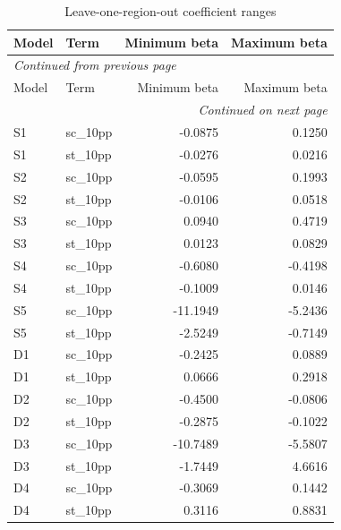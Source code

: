\documentclass[11pt,a4paper]{report}
\begin{document}
\begin{longtable}{llrr}
\caption{Leave-one-region-out coefficient ranges}\\\toprule
Model & Term & Minimum beta & Maximum beta \\\midrule\endfirsthead
\multicolumn{4}{l}{\textit{Continued from previous page}}\\\toprule
Model & Term & Minimum beta & Maximum beta \\\midrule\endhead
\midrule\multicolumn{4}{r}{\textit{Continued on next page}}\\\endfoot\bottomrule\endlastfoot
S1 & sc\_10pp & -0.0875 & 0.1250 \\
S1 & st\_10pp & -0.0276 & 0.0216 \\
S2 & sc\_10pp & -0.0595 & 0.1993 \\
S2 & st\_10pp & -0.0106 & 0.0518 \\
S3 & sc\_10pp & 0.0940 & 0.4719 \\
S3 & st\_10pp & 0.0123 & 0.0829 \\
S4 & sc\_10pp & -0.6080 & -0.4198 \\
S4 & st\_10pp & -0.1009 & 0.0146 \\
S5 & sc\_10pp & -11.1949 & -5.2436 \\
S5 & st\_10pp & -2.5249 & -0.7149 \\
D1 & sc\_10pp & -0.2425 & 0.0889 \\
D1 & st\_10pp & 0.0666 & 0.2918 \\
D2 & sc\_10pp & -0.4500 & -0.0806 \\
D2 & st\_10pp & -0.2875 & -0.1022 \\
D3 & sc\_10pp & -10.7489 & -5.5807 \\
D3 & st\_10pp & -1.7449 & 4.6616 \\
D4 & sc\_10pp & -0.3069 & 0.1442 \\
D4 & st\_10pp & 0.3116 & 0.8831 \\
\end{longtable}\endgroup
\begingroup\footnotesize\setlength{\tabcolsep}{4pt}
\end{document}
